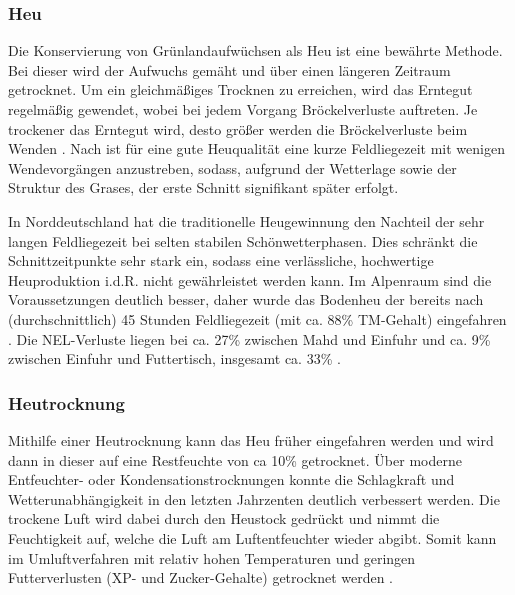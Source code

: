 
\subsubsection{Heu}
\label{subsub:Heu}
Die Konservierung von Grünlandaufwüchsen als Heu ist eine bewährte Methode.
Bei dieser wird der Aufwuchs gemäht und über einen längeren Zeitraum getrocknet.
Um ein gleichmäßiges Trocknen zu erreichen, wird das Erntegut regelmäßig gewendet, wobei bei jedem Vorgang Bröckelverluste auftreten.
Je trockener das Erntegut wird, desto größer werden die Bröckelverluste beim Wenden \parencite[12]{sauter2008brockelverluste}.
Nach \textcite[125]{resch2019heuqualitat} ist für eine gute Heuqualität eine kurze Feldliegezeit mit wenigen Wendevorgängen anzustreben, sodass, aufgrund der Wetterlage sowie der Struktur des Grases, der erste Schnitt signifikant später erfolgt.

In Norddeutschland hat die traditionelle Heugewinnung den Nachteil der sehr langen Feldliegezeit bei selten stabilen Schönwetterphasen.
Dies schränkt die Schnittzeitpunkte sehr stark ein, sodass eine verlässliche, hochwertige Heuproduktion i.d.R. nicht gewährleistet werden kann.
Im Alpenraum sind die Voraussetzungen deutlich besser, daher wurde das Bodenheu der \HBLFA bereits nach (durchschnittlich) 45 Stunden Feldliegezeit (mit ca. 88\% \ac{TM}-Gehalt) eingefahren \parencite[63]{gruber2015einfluss}.
Die \ac{NEL}-Verluste liegen bei ca. 27\% zwischen Mahd und Einfuhr und ca. 9\% zwischen Einfuhr und Futtertisch, insgesamt ca. 33\% \parencite[30]{fritz2018wirtschaftliche}.

\subsubsection{Heutrocknung}
\label{subsub:Heutrocknung}
Mithilfe einer Heutrocknung kann das Heu früher eingefahren werden und wird dann in dieser auf eine Restfeuchte von ca 10\% getrocknet.
Über moderne Entfeuchter- oder Kondensationstrocknungen konnte die Schlagkraft und Wetterunabhängigkeit in den letzten Jahrzenten deutlich verbessert werden.
Die trockene Luft wird dabei durch den Heustock gedrückt und nimmt die Feuchtigkeit auf, welche die Luft am Luftentfeuchter wieder abgibt.
Somit kann im Umluftverfahren mit relativ hohen Temperaturen und geringen Futterverlusten (\ac{XP}- und Zucker-Gehalte) getrocknet werden \parencite[122]{resch2019heuqualitat}.

